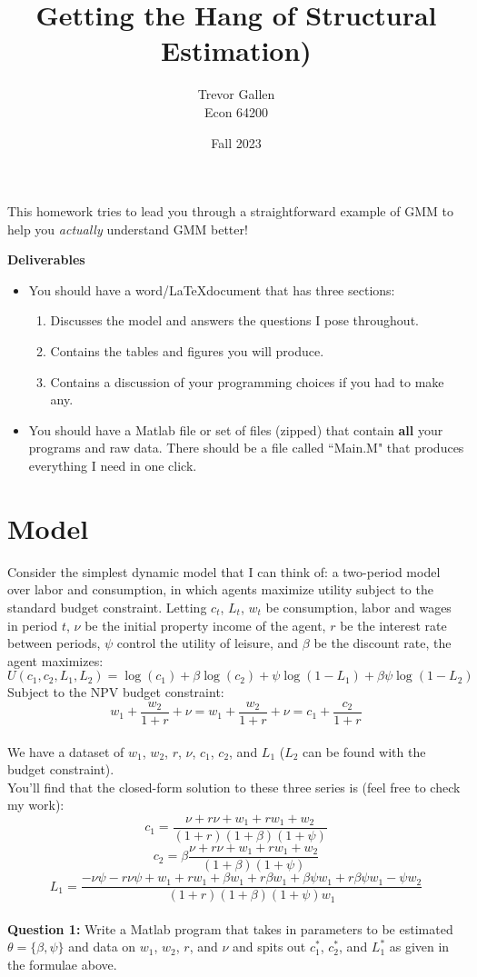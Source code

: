 \documentclass[11pt]{article}
\title{Getting the Hang of Structural Estimation)  }
\author{ Trevor Gallen \\ Econ 64200 }
\date{Fall 2023}
\begin{document}


\maketitle

This homework tries to lead you through a straightforward example of GMM to help you \emph{actually} understand GMM better!  


\textbf{Deliverables}
\begin{itemize}
\item You should have a word/\LaTeX document that has three sections: 
\begin{enumerate}
\item Discusses the model and answers the questions I pose throughout.
\item Contains the tables and figures you will produce.
\item Contains a discussion of your programming choices if you had to make any.
\end{enumerate}
\item You should have a Matlab file or set of files (zipped) that contain \textbf{all} your programs and raw data.  There should be a file called ``Main.M" that produces everything I need in one click.
\end{itemize}


\section{Model}
Consider the simplest dynamic model that I can think of: a two-period model over labor and consumption, in which agents maximize utility subject to the standard budget constraint.  Letting $c_t$, $L_t$, $w_t$ be consumption, labor and wages in period $t$, $\nu$ be the initial property income of the agent,  $r$ be the interest rate between periods, $\psi$ control the utility of leisure, and $\beta$ be the discount rate, the agent maximizes:
$$U(c_1,c_2,L_1,L_2)=\log(c_1)+\beta\log(c_2)+\psi\log(1-L_1)+\beta\psi\log(1-L_2)$$
Subject to the NPV budget constraint:
$$w_1+\frac{w_2}{1+r}+\nu=w_1+\frac{w_2}{1+r}+\nu=c_1+\frac{c_2}{1+r}$$
\ \\
We have a dataset of $w_1$, $w_2$, $r$, $\nu$, $c_1$, $c_2$, and $L_1$ ($L_2$ can be found with the budget constraint).  \
\ \\
You'll find that the closed-form solution to these three series is (feel free to check my work):
$$c_1=\frac{\nu+r \nu+w_1+r w_1+w_2}{(1+r) (1+\beta) (1+\psi)}$$
$$c_2=\beta\frac{\nu+r \nu+w_1+r w_1+w_2}{(1+\beta) (1+\psi)}$$
$$L_1=\frac{-\nu \psi-r \nu \psi+w_1+r w_1+\beta w_1+r \beta w_1+\beta \psi w_1+r \beta \psi w_1-\psi w_2}{(1+r) (1+\beta) (1+\psi) w_1}$$
\ \\
\textbf{Question 1:} Write a Matlab program that takes in parameters to be estimated $\theta=\{\beta,\psi\}$ and data on $w_1$, $w_2$, $r$, and $\nu$ and spits out $c_1^*$, $c_2^*$, and $L_1^*$ as given in the formulae above.  \\
\ \\
\end{document}
